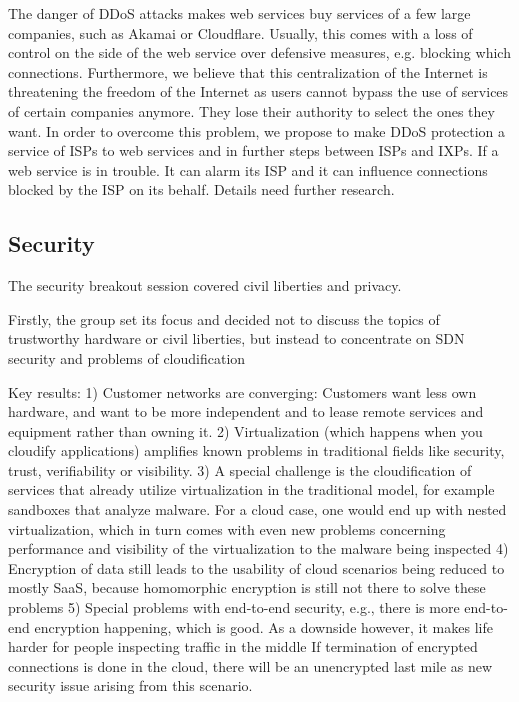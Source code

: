 The danger of \ac{DDoS} attacks makes web services buy services of a few large
companies, such as Akamai or Cloudflare. Usually, this comes with a loss of
control on the side of the web service over defensive measures, e.g. blocking
which connections. Furthermore, we believe that this centralization of the
Internet is threatening the freedom of the Internet as users cannot bypass the
use of services of certain companies anymore. They lose their authority to
select the ones they want. In order to overcome this problem, we propose to
make \ac{DDoS} protection a service of ISPs to web services and in further
steps between ISPs and IXPs. If a web service is in trouble. It can alarm its
ISP and it can influence connections blocked by the ISP on its behalf. Details
need further research.

\subsection{Security}

The security breakout session covered civil liberties and privacy.

Firstly, the group set its focus and decided not to discuss the topics of
trustworthy hardware or civil liberties, but instead to concentrate on SDN
security and problems of cloudification

Key results: 1) Customer networks are converging:  Customers want less own
hardware, and want to be more independent and to lease remote services and
equipment rather than owning it.  2) Virtualization (which happens when you
cloudify applications) amplifies known problems in traditional fields like
security, trust, verifiability or visibility.  3) A special challenge is the
cloudification of services that already utilize virtualization in the
traditional model, for example sandboxes that analyze malware.  For a cloud
case, one would end up with nested virtualization, which in turn comes with
even new problems concerning performance and visibility of the virtualization
to the malware being inspected 4) Encryption of data still leads to the
usability of cloud scenarios being reduced to mostly SaaS, because homomorphic
encryption is still not there to solve these problems 5) Special problems with
end-to-end security, e.g., there is more end-to-end encryption happening,
which is good.  As a downside however, it makes life harder for people
inspecting traffic in the middle If termination of encrypted connections is
done in the cloud, there will be an unencrypted last mile as new security
issue arising from this scenario.

